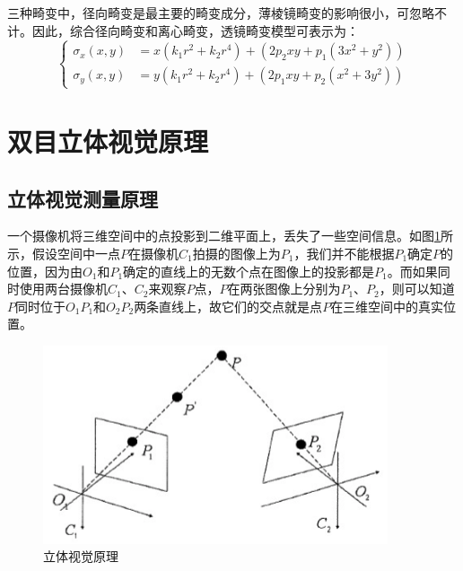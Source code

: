 三种畸变中，径向畸变是最主要的畸变成分，薄棱镜畸变的影响很小，可忽略不计。因此，综合径向畸变和离心畸变，透镜畸变模型可表示为：
%
\begin{equation}\label{eq:2_1_overall_distortion}
\left\{
\begin{aligned}
\sigma_x(x,y) &= x(k_1 r^2 + k_2 r^4) + (2p_2 xy + p_1 (3x^2 + y^2))  \\
\sigma_y(x,y) &= y(k_1 r^2 + k_2 r^4)  + (2p_1 xy + p_2 (x^2 + 3y^2))
\end{aligned}
\right.
\end{equation}



\section{双目立体视觉原理}

\subsection{立体视觉测量原理} %
一个摄像机将三维空间中的点投影到二维平面上，丢失了一些空间信息。如图\ref{fig:2_3_stereo_principle}所示，假设空间中一点$P$在摄像机$C_1$拍摄的图像上为$P_1$，我们并不能根据$P_1$确定$P$的位置，因为由$O_1$和$P_1$确定的直线上的无数个点在图像上的投影都是$P_1$。而如果同时使用两台摄像机$C_1$、$C_2$来观察$P$点，$P$在两张图像上分别为$P_1$、$P_2$，则可以知道$P$同时位于$O_1P_1$和$O_2P_2$两条直线上，故它们的交点就是点$P$在三维空间中的真实位置。

\begin{figure}[!htb] %
	\centering
	\includegraphics[width=4in]{figures/2_3_stereo_principle}
	\caption{立体视觉原理}\label{fig:2_3_stereo_principle}
\end{figure}

